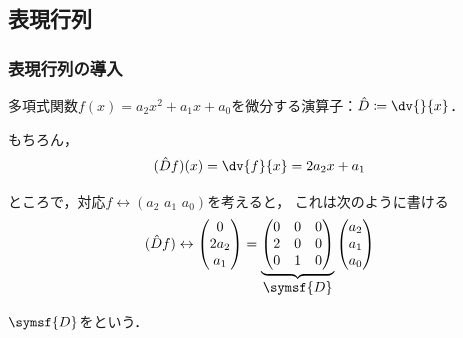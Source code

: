 \documentclass[
    10pt,
    ]{sotsu-beamer}
\begin{document}
\subsection{表現行列}

\begin{frame}
    \frametitle{表現行列の導入}

    多項式関数$f(x) = a_2 x^2 + a_1 x + a_0$を微分する演算子：$\hat{D} \coloneq \dv{}{x}$．

    もちろん，
    \begin{equation*}
        (\hat{D} f) (x) = \dv{f}{x} = 2 a_2 x + a_1
    \end{equation*}

    \pause

    ところで，対応$f \leftrightarrow (a_2 \,\, a_1 \,\, a_0)$を考えると，
    これは次のように書ける
    \begin{equation*}
        (\hat{D} f)
        \leftrightarrow
        \begin{pmatrix}
            0  \\  2 a_2  \\  a_1
        \end{pmatrix}
        =
        \underbrace{
        \begin{pmatrix}
            0  &  0  &  0  \\
            2  &  0  &  0  \\
            0  &  1  &  0
        \end{pmatrix}
        }_{\text{\normalsize$\symsf{D}$}}
        \begin{pmatrix}
            a_2  \\  a_1  \\  a_0
        \end{pmatrix}
    \end{equation*}

    \pause

    $\symsf{D}$をという．

\end{frame}
\end{document}

